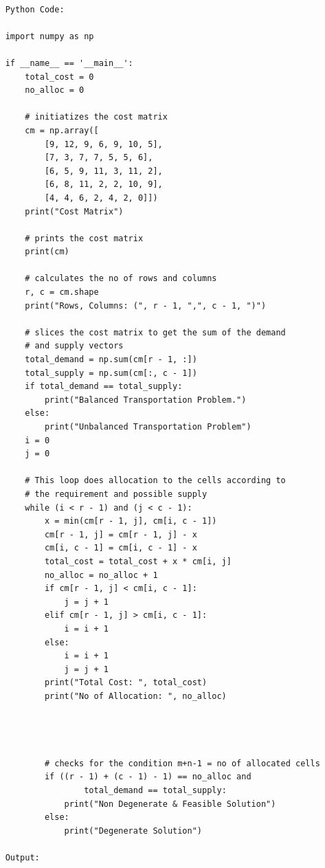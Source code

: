 \documentclass[12pt, letterpaper, twoside]{book}
\begin{document}
\begin{lstlisting}

	Python Code:
	
	import numpy as np
	
	if __name__ == '__main__':
		total_cost = 0
		no_alloc = 0
		
		# initiatizes the cost matrix
		cm = np.array([
			[9, 12, 9, 6, 9, 10, 5], 
			[7, 3, 7, 7, 5, 5, 6], 
			[6, 5, 9, 11, 3, 11, 2], 
			[6, 8, 11, 2, 2, 10, 9],
			[4, 4, 6, 2, 4, 2, 0]])
		print("Cost Matrix")
		
		# prints the cost matrix
		print(cm)
		
		# calculates the no of rows and columns
		r, c = cm.shape
		print("Rows, Columns: (", r - 1, ",", c - 1, ")")
		
		# slices the cost matrix to get the sum of the demand 
		# and supply vectors
		total_demand = np.sum(cm[r - 1, :])
		total_supply = np.sum(cm[:, c - 1])
		if total_demand == total_supply:
			print("Balanced Transportation Problem.")
		else:
			print("Unbalanced Transportation Problem")
		i = 0
		j = 0
		
		# This loop does allocation to the cells according to
		# the requirement and possible supply
		while (i < r - 1) and (j < c - 1):
			x = min(cm[r - 1, j], cm[i, c - 1])
			cm[r - 1, j] = cm[r - 1, j] - x
			cm[i, c - 1] = cm[i, c - 1] - x
			total_cost = total_cost + x * cm[i, j]
			no_alloc = no_alloc + 1
			if cm[r - 1, j] < cm[i, c - 1]:
				j = j + 1
			elif cm[r - 1, j] > cm[i, c - 1]:
				i = i + 1
			else:
				i = i + 1
				j = j + 1
			print("Total Cost: ", total_cost)
			print("No of Allocation: ", no_alloc)
			
			
			
			
			# checks for the condition m+n-1 = no of allocated cells
			if ((r - 1) + (c - 1) - 1) == no_alloc and 
					total_demand == total_supply:
				print("Non Degenerate & Feasible Solution")
			else:
				print("Degenerate Solution")
	
	Output:

\end{lstlisting}
\end{document}

